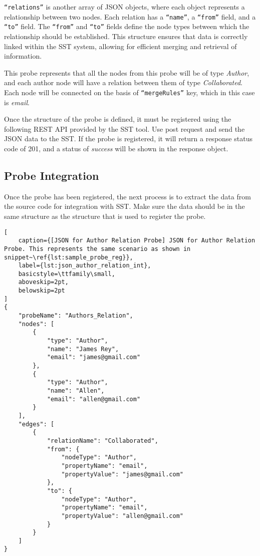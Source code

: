 \texttt{``relations''} is another array of JSON objects, where each object represents a relationship between two nodes. Each relation has a \texttt{``name''}, a \texttt{``from''} field, and a \texttt{``to''} field. The \texttt{``from''} and \texttt{``to''} fields define the node types between which the relationship should be established. This structure ensures that data is correctly linked within the SST system, allowing for efficient merging and retrieval of information.

This probe represents that all the nodes from this probe will be of type \textit{Author}, and each author node will have a relation between them of type \textit{Collaborated}. Each node will be connected on the basis of \texttt{``mergeRules''} key, which in this case is \textit{email}.

Once the structure of the probe is defined, it must be registered using the following REST API provided by the SST tool. Use post request and send the JSON data to the SST. If the probe is registered, it will return a response status code of 201, and a status of \textit{success} will be shown in the response object.

\subsection{Probe Integration}

Once the probe has been registered, the next process is to extract the data from the source code for integration with SST. Make sure the data should be in the same structure as the structure that is used to register the probe.
\newpage
\begin{lstlisting}[
    caption={[JSON for Author Relation Probe] JSON for Author Relation Probe. This represents the same scenario as shown in snippet~\ref{lst:sample_probe_reg}}, 
    label={lst:json_author_relation_int},
    basicstyle=\ttfamily\small,
    aboveskip=2pt,
    belowskip=2pt
]
{
    "probeName": "Authors_Relation",
    "nodes": [
        {
            "type": "Author",
            "name": "James Rey",
            "email": "james@gmail.com"
        },
        {
            "type": "Author",
            "name": "Allen",
            "email": "allen@gmail.com"
        }
    ],
    "edges": [
        {
            "relationName": "Collaborated",
            "from": {
                "nodeType": "Author",
                "propertyName": "email",
                "propertyValue": "james@gmail.com"
            },
            "to": {
                "nodeType": "Author",
                "propertyName": "email",
                "propertyValue": "allen@gmail.com"
            }
        }
    ]
}
\end{lstlisting}